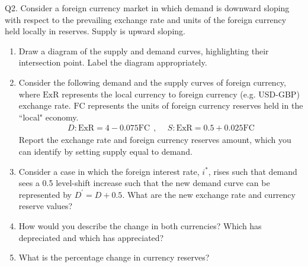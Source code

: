 \documentclass[12pt]{article}
\begin{document}
\newpage

\noindent Q2. Consider a foreign currency market in which demand is downward sloping with respect to the prevailing exchange rate and units of the foreign currency held locally in reserves. Supply is upward sloping.

\begin{enumerate}[1)]
	\item Draw a diagram of the supply and demand curves, highlighting their intersection point. Label the diagram appropriately. 
	
	\vspace{2in}
	
	\newpage
	
	\item Consider the following demand and the supply curves of foreign currency, where $\text{ExR}$ represents the local currency to foreign currency (e.g. USD-GBP) exchange rate.
	$\text{FC}$ represents the units of foreign currency reserves held in the ``local" economy. 
	\begin{align*}
	D: \text{ExR} =  4 - 0.075 \text{FC} \ \ , & \ \ S: \text{ExR} =  0.5 + 0.025 \text{FC}
	\end{align*}
	Report the exchange rate and foreign currency reserves amount, which you can identify by setting supply equal to demand. 
	
	
	\vspace{2.6in}
	
	\item Consider a case in which the foreign interest rate, $i^*$, rises such that demand sees a 0.5 level-shift increase such that the new demand curve can be represented by $D^{'} = D + 0.5$.
	What are the new exchange rate and currency reserve values?
	
	\newpage
	
	\item How would you describe the change in both currencies? Which has depreciated and which has appreciated?
	
	\vspace{1.6in}
	
	\item What is the percentage change in currency reserves?
	
	\vspace{1.3in}
	
\end{enumerate}
\end{document}
